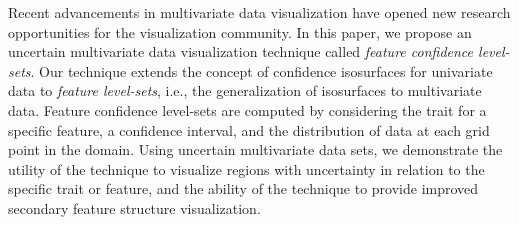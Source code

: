 %
Recent advancements in multivariate data visualization have opened new research opportunities for the visualization community.
%
In this paper, we propose 
an uncertain multivariate data visualization technique called \textit{feature confidence level-sets}.
%
Our technique extends the concept of confidence isosurfaces for univariate data to \textit{feature level-sets}, i.e., the generalization of isosurfaces to multivariate data.
%
Feature confidence level-sets are computed by considering the trait for a specific feature, a confidence interval, and the distribution of data at each grid point in the domain.
%
%
Using uncertain multivariate data sets, we demonstrate the utility of the technique to visualize regions with uncertainty in relation to the specific trait or feature, and the ability of the technique to provide improved secondary feature structure visualization.


%
